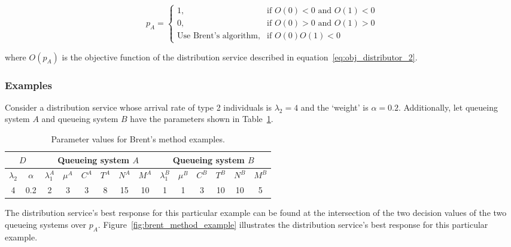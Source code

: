 \begin{equation}\label{eq:obj_distributor_implementation}
    p_A = \begin{cases}
        1, & \text{if } O(0) < 0 \text{ and } O(1) < 0 \\
        0, & \text{if } O(0) > 0 \text{ and } O(1) > 0 \\
        \text{Use Brent's algorithm}, & \text{if } O(0)O(1) < 0
    \end{cases}
\end{equation}

where \(O(p_A)\) is the objective function of the distribution service described
in equation~\eqref{eq:obj_distributor_2}.

\subsubsection{Examples}\label{sec:brent_method_example}
Consider a distribution service whose arrival rate of type 2 individuals is
\(\lambda_2 = 4\) and the `weight' is \(\alpha = 0.2\).
Additionally, let queueing system \(A\) and queueing system \(B\) have the
parameters shown in Table~\ref{tab:parameters_example_brent_method}.

\begin{table}[H]
    \small
    \caption{Parameter values for Brent's method examples.}
    \begin{center}
        \begin{tabular}{||c|c||c|c|c|c|c|c||c|c|c|c|c|c||}
            \hline
            \multicolumn{2}{||c||}{\textbf{\(D\)}} &
            \multicolumn{6}{c||}{\textbf{Queueing system \(A\)}} &
            \multicolumn{6}{c||}{\textbf{Queueing system \(B\)}} \\
            \hline
            \(\lambda_2\) & \(\alpha\) &
            \(\lambda_1^A\) & \(\mu^A\) & \(C^A\) & \(T^A\) & \(N^A\) & \(M^A\) &
            \(\lambda_1^B\) & \(\mu^B\) & \(C^B\) & \(T^B\) & \(N^B\) & \(M^B\) \\
            \hline
            4 & 0.2 & 2 & 3 & 3 & 8 & 15 & 10 & 1 & 1 & 3 & 10 & 10 & 5 \\
            \hline
        \end{tabular}
    \end{center}
    \label{tab:parameters_example_brent_method}
\end{table}

The distribution service's best response for this particular example can be
found at the intersection of the two decision values of the two queueing
systems over \(p_A\).
Figure~\ref{fig:brent_method_example} illustrates the distribution service's
best response for this particular example.

